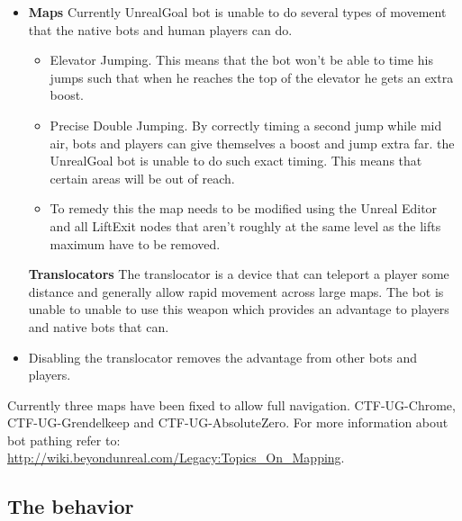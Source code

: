 \documentclass[11pt,a4paper]{article}
\begin{document}
\begin{itemize}

	\item \textbf{Maps} Currently UnrealGoal bot is unable to do several types of movement that the native bots and human players can do. 
	\begin{itemize}
		\item Elevator Jumping. This means that the bot won't be able to time his jumps such that when he reaches the top of the elevator he gets an extra boost. 
		\item Precise Double Jumping. By correctly timing a second jump while mid air, bots and players can give themselves a boost and jump extra far. the UnrealGoal bot is unable to do such exact timing. This means that certain areas will be out of reach.
		\item To remedy this the map needs to be modified using the Unreal Editor and  all LiftExit nodes that aren't roughly at the same level as the lifts maximum have to be removed.
	\end{itemize}
		 \textbf{Translocators} The translocator is a device that can teleport a player some distance and generally allow rapid movement across large maps. The bot is unable to unable to use this weapon which provides an advantage to players and native bots that can.
		\item Disabling the translocator removes the advantage from other bots and players.
\end{itemize}


Currently three maps have been fixed to allow full navigation. CTF-UG-Chrome, CTF-UG-Grendelkeep and CTF-UG-AbsoluteZero. For more information about bot pathing refer to: \url{http://wiki.beyondunreal.com/Legacy:Topics_On_Mapping}.


\subsection{The behavior}

\end{document}
